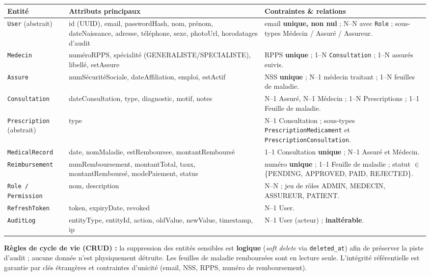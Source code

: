 \documentclass[11pt,a4paper]{article}
\begin{document}
\begin{center}
\begin{longtable}{|L{3.0cm}|L{7.0cm}|L{4.0cm}|}
\hline
{}\textbf{Entité} & \textbf{Attributs principaux} & \textbf{Contraintes \& relations}\\\hline
\endhead
\texttt{User} (abstrait) & id (UUID), email, passwordHash, nom, prénom, dateNaissance,
adresse, téléphone, sexe, photoUrl, horodatages d'audit & email \textbf{unique, non nul} ;
N--N avec \texttt{Role} ; sous-types Médecin / Assuré / Assureur.\\\hline
\texttt{Medecin} & numéroRPPS, spécialité (GENERALISTE/SPECIALISTE), libellé, estAssure &
RPPS \textbf{unique} ; 1--N \texttt{Consultation} ; 1--N assurés suivis.\\\hline
\texttt{Assure} & numSécuritéSociale, dateAffiliation, emploi, estActif &
NSS \textbf{unique} ; N--1 médecin traitant ; 1--N feuilles de maladie.\\\hline
\texttt{Consultation} & dateConsultation, type, diagnostic, motif, notes &
N--1 Assuré, N--1 Médecin ; 1--N Prescriptions ; 1--1 Feuille de maladie.\\\hline
\texttt{Prescription} (abstrait) & type & N--1 Consultation ; sous-types
\texttt{PrescriptionMedicament} et \texttt{PrescriptionConsultation}.\\\hline
\texttt{MedicalRecord} & date, nomMaladie, estRemboursee, montantRemboursé &
1--1 Consultation \textbf{unique} ; N--1 Assuré et Médecin.\\\hline
\texttt{Reimbursement} & numRemboursement, montantTotal, taux, montantRemboursé,
modePaiement, status & numéro \textbf{unique} ; 1--1 Feuille de maladie ; statut $\in$
\{PENDING, APPROVED, PAID, REJECTED\}.\\\hline
\texttt{Role / Permission} & nom, description & N--N ; jeu de rôles ADMIN, MEDECIN,
ASSUREUR, PATIENT.\\\hline
\texttt{RefreshToken} & token, expiryDate, revoked & N--1 User.\\\hline
\texttt{AuditLog} & entityType, entityId, action, oldValue, newValue, timestamp, ip &
N--1 User (acteur) ; \textbf{inaltérable}.\\\hline
\end{longtable}
\end{center}

\textbf{Règles de cycle de vie (CRUD) :} la suppression des entités sensibles est
\textbf{logique} (\emph{soft delete} via \texttt{deleted\_at}) afin de préserver la
piste d'audit ; aucune donnée n'est physiquement détruite. Les feuilles de maladie
remboursées sont en lecture seule. L'intégrité référentielle est garantie par clés
étrangères et contraintes d'unicité (email, NSS, RPPS, numéro de remboursement).
\end{document}
